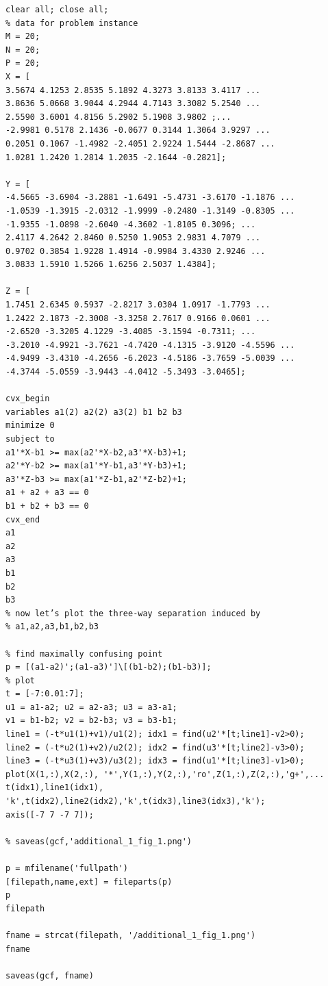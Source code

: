 \documentclass{article}
\begin{document}
\begin{verbatim}
clear all; close all;
% data for problem instance
M = 20;
N = 20;
P = 20;
X = [
3.5674 4.1253 2.8535 5.1892 4.3273 3.8133 3.4117 ...
3.8636 5.0668 3.9044 4.2944 4.7143 3.3082 5.2540 ...
2.5590 3.6001 4.8156 5.2902 5.1908 3.9802 ;...
-2.9981 0.5178 2.1436 -0.0677 0.3144 1.3064 3.9297 ...
0.2051 0.1067 -1.4982 -2.4051 2.9224 1.5444 -2.8687 ...
1.0281 1.2420 1.2814 1.2035 -2.1644 -0.2821];

Y = [
-4.5665 -3.6904 -3.2881 -1.6491 -5.4731 -3.6170 -1.1876 ...
-1.0539 -1.3915 -2.0312 -1.9999 -0.2480 -1.3149 -0.8305 ...
-1.9355 -1.0898 -2.6040 -4.3602 -1.8105 0.3096; ...
2.4117 4.2642 2.8460 0.5250 1.9053 2.9831 4.7079 ...
0.9702 0.3854 1.9228 1.4914 -0.9984 3.4330 2.9246 ...
3.0833 1.5910 1.5266 1.6256 2.5037 1.4384];

Z = [
1.7451 2.6345 0.5937 -2.8217 3.0304 1.0917 -1.7793 ...
1.2422 2.1873 -2.3008 -3.3258 2.7617 0.9166 0.0601 ...
-2.6520 -3.3205 4.1229 -3.4085 -3.1594 -0.7311; ...
-3.2010 -4.9921 -3.7621 -4.7420 -4.1315 -3.9120 -4.5596 ...
-4.9499 -3.4310 -4.2656 -6.2023 -4.5186 -3.7659 -5.0039 ...
-4.3744 -5.0559 -3.9443 -4.0412 -5.3493 -3.0465];

cvx_begin
variables a1(2) a2(2) a3(2) b1 b2 b3
minimize 0
subject to 
a1'*X-b1 >= max(a2'*X-b2,a3'*X-b3)+1;
a2'*Y-b2 >= max(a1'*Y-b1,a3'*Y-b3)+1;
a3'*Z-b3 >= max(a1'*Z-b1,a2'*Z-b2)+1;
a1 + a2 + a3 == 0
b1 + b2 + b3 == 0
cvx_end
a1
a2
a3
b1
b2
b3
% now let’s plot the three-way separation induced by
% a1,a2,a3,b1,b2,b3

% find maximally confusing point
p = [(a1-a2)';(a1-a3)']\[(b1-b2);(b1-b3)];
% plot
t = [-7:0.01:7];
u1 = a1-a2; u2 = a2-a3; u3 = a3-a1;
v1 = b1-b2; v2 = b2-b3; v3 = b3-b1;
line1 = (-t*u1(1)+v1)/u1(2); idx1 = find(u2'*[t;line1]-v2>0);
line2 = (-t*u2(1)+v2)/u2(2); idx2 = find(u3'*[t;line2]-v3>0);
line3 = (-t*u3(1)+v3)/u3(2); idx3 = find(u1'*[t;line3]-v1>0);
plot(X(1,:),X(2,:), '*',Y(1,:),Y(2,:),'ro',Z(1,:),Z(2,:),'g+',...
t(idx1),line1(idx1), 'k',t(idx2),line2(idx2),'k',t(idx3),line3(idx3),'k');
axis([-7 7 -7 7]);

% saveas(gcf,'additional_1_fig_1.png')

p = mfilename('fullpath')
[filepath,name,ext] = fileparts(p)
p
filepath

fname = strcat(filepath, '/additional_1_fig_1.png')
fname

saveas(gcf, fname)	
\end{verbatim}
\end{document}
